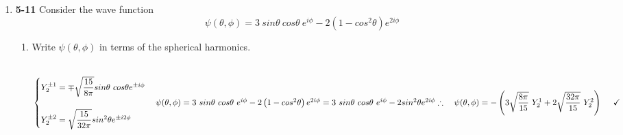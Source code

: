 \documentclass[fleqn]{article}
\begin{document}
\begin{enumerate}


    \item \textbf{5-11} Consider the wave function
    $$
      \psi(\theta, \phi)=3 ~ sin\theta ~ cos\theta ~ e^{i \phi}-2\left(1-cos^2\theta\right) e^{2i\phi}
    $$
    \begin{enumerate}
      \item Write $\psi(\theta, \phi)$ in terms of the spherical harmonics.

        \textcolor{hwColor}{
          \\
          $
            \begin{cases}
              Y^{\pm1}_2=\mp \sqrt{\dfrac{15}{8\pi}} sin\theta ~ cos\theta e^{\pm i \phi}
              \\
              \\
              Y^{\pm2}_2=\sqrt{\dfrac{15}{32\pi}} sin^2\theta e^{\pm i 2\phi}
            \end{cases}
            \\
            \\
            \\
            \psi(\theta, \phi)=3 ~ sin\theta ~ cos\theta ~ e^{i \phi}-2\left(1-cos^2\theta\right) e^{2i\phi}
            \\
            \\
            \\
            =3 ~ sin\theta ~ cos\theta ~ e^{i \phi}-2 sin^2\theta e^{2i\phi}
            \\
            \\
            \\
            \\
            \therefore ~~~  \psi(\theta, \phi)=-\left(3\sqrt{\dfrac{8 \pi}{15}} ~ Y^1_2+2 \sqrt{\dfrac{32 \pi}{15}} ~ Y^2_2\right) ~~~~ \checkmark
          $
          \\
          \\
        }



\end{enumerate}
\end{enumerate}
\end{document}
